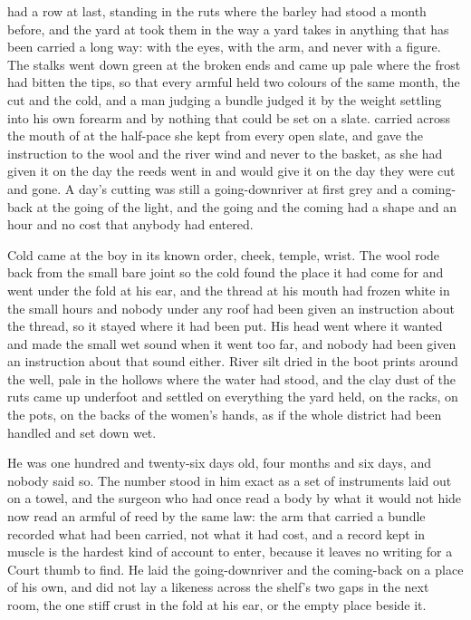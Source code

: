 
 had a row at last, standing in the ruts where the barley had stood a month before, and the yard at  took them in the way a yard takes in anything that has been carried a long way: with the eyes, with the arm, and never with a figure. The stalks went down green at the broken ends and came up pale where the frost had bitten the tips, so that every armful held two colours of the same month, the cut and the cold, and a man judging a bundle judged it by the weight settling into his own forearm and by nothing that could be set on a slate.  carried  across the mouth of  at the half-pace she kept from every open slate, and gave the instruction to the wool and the river wind and never to the basket, as she had given it on the day the reeds went in and would give it on the day they were cut and gone. A day's cutting was still a going-downriver at first grey and a coming-back at the going of the light, and the going and the coming had a shape and an hour and no cost that anybody had entered.

Cold came at the boy in its known order, cheek, temple, wrist. The wool rode back from the small bare joint so the cold found the place it had come for and went under the fold at his ear, and the thread at his mouth had frozen white in the small hours and nobody under any roof had been given an instruction about the thread, so it stayed where it had been put. His head went where it wanted and made the small wet sound when it went too far, and nobody had been given an instruction about that sound either. River silt dried in the boot prints around the well, pale in the hollows where the water had stood, and the clay dust of the ruts came up underfoot and settled on everything the yard held, on the racks, on the pots, on the backs of the women's hands, as if the whole district had been handled and set down wet.

He was one hundred and twenty-six days old, four months and six days, and nobody said so. The number stood in him exact as a set of instruments laid out on a towel, and the surgeon who had once read a body by what it would not hide now read an armful of reed by the same law: the arm that carried a bundle recorded what had been carried, not what it had cost, and a record kept in muscle is the hardest kind of account to enter, because it leaves no writing for a Court thumb to find. He laid the going-downriver and the coming-back on a place of his own, and did not lay a likeness across the shelf's two gaps in the next room, the one stiff crust in the fold at his ear, or the empty place beside it.

